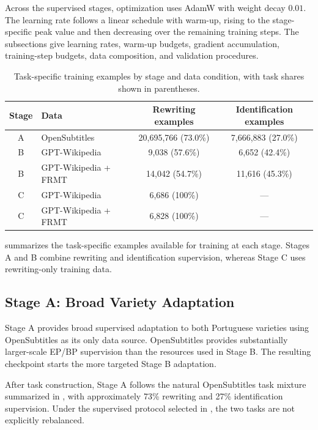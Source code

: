 Across the supervised stages, optimization uses AdamW
\citep{Loshchilov2017DecoupledWD} with weight decay \(0.01\). The learning rate
follows a linear schedule with warm-up, rising to the stage-specific peak value
and then decreasing over the remaining training steps. The
subsections give learning rates, warm-up budgets, gradient
accumulation, training-step budgets, data composition, and validation
procedures.

\begin{table}[htbp]
  \centering
  \thesistablefont
  \setlength{\tabcolsep}{5pt}
  \renewcommand{\arraystretch}{1.12}
  \caption{Task-specific training examples by stage and data condition, with task shares shown in parentheses.}
  \label{tab:method-training-composition}
  \begin{tabularx}{\textwidth}{@{}cYcc@{}}
    \toprule
    Stage & Data & Rewriting examples & Identification examples \\
    \midrule
    A & OpenSubtitles & 20,695,766 (73.0\%) & 7,666,883 (27.0\%) \\
    \midrule
    B & GPT-Wikipedia & 9,038 (57.6\%) & 6,652 (42.4\%) \\
    B & GPT-Wikipedia + FRMT & 14,042 (54.7\%) & 11,616 (45.3\%) \\
    \midrule
    C & GPT-Wikipedia & 6,686 (100\%) & --- \\
    C & GPT-Wikipedia + FRMT & 6,828 (100\%) & --- \\
    \bottomrule
  \end{tabularx}
\end{table}

 summarizes the task-specific examples
available for training at each stage. Stages A and B combine rewriting and
identification supervision, whereas Stage C uses rewriting-only training data.

\subsection{Stage A: Broad Variety Adaptation}
\label{sec:method-stage-a}

Stage A provides broad supervised adaptation to both Portuguese varieties using
OpenSubtitles as its only data source. OpenSubtitles provides substantially
larger-scale EP/BP supervision than the resources used in Stage B. The resulting
checkpoint starts the more targeted Stage B adaptation.

After task construction, Stage A follows the natural OpenSubtitles task mixture
summarized in , with approximately 73\%
rewriting and 27\% identification supervision. Under the supervised protocol
selected in , the two tasks are not explicitly
rebalanced.

